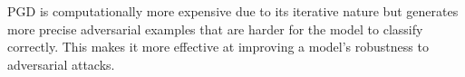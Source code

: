 \documentclass{article}
\begin{document}
PGD is computationally more expensive due to its iterative nature but generates more precise adversarial examples that are harder for the model to classify correctly. This makes it more effective at improving a model's robustness to adversarial attacks.





















\newpage

 
\end{document}
